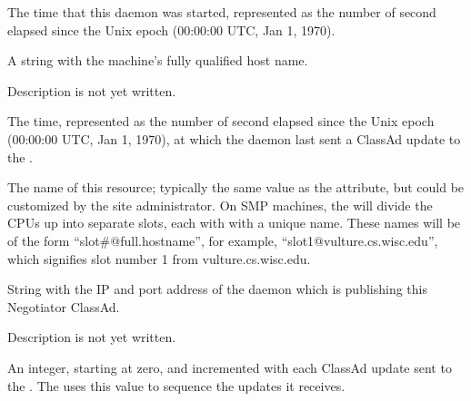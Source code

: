 \begin{description}

\item[\AdAttr{DaemonStartTime}:] The time that this daemon was
  started, represented as the number of second elapsed since
    the Unix epoch (00:00:00 UTC, Jan 1, 1970).

\item[\AdAttr{Machine}:] A string with the machine's fully qualified 
  host name.

\item[\AdAttr{MyAddress}:] Description is not yet written.

\item[\AdAttr{MyCurrentTime}:]  The time, represented as the number of 
  second elapsed since the Unix epoch (00:00:00 UTC, Jan 1, 1970),
  at which the  daemon last sent a ClassAd update to the
  .

\item[\AdAttr{Name}:] The name of this resource; typically the same value as
  the  attribute, but could be customized by the site
  administrator.
  On SMP machines, the  will divide the CPUs up into separate
  slots, each with with a unique name.
  These names will be of the form ``slot\#@full.hostname'', for example,
  ``slot1@vulture.cs.wisc.edu'', which signifies slot number 1 from
  vulture.cs.wisc.edu.

\item[\AdAttr{NegotiatorIpAddr}:] String with the IP and port address of the
 daemon which is publishing this Negotiator ClassAd.

\item[\AdAttr{PublicNetworkIpAddr}:] Description is not yet written.

\item[\AdAttr{UpdateSequenceNumber}:] An integer, starting at zero,
  and incremented with each ClassAd update sent to the .
  The  uses this value to sequence the updates it
  receives.

\end{description}

